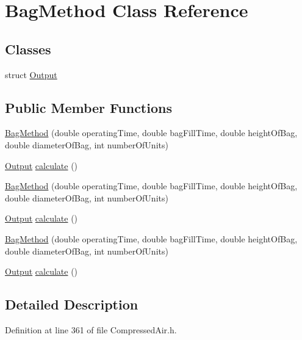 \hypertarget{class_bag_method}{}\section{Bag\+Method Class Reference}
\label{class_bag_method}
\subsection*{Classes}
\begin{DoxyCompactItemize}
\item 
struct \hyperlink{struct_bag_method_1_1_output}{Output}
\end{DoxyCompactItemize}
\subsection*{Public Member Functions}
\begin{DoxyCompactItemize}
\item 
\hyperlink{class_bag_method_ade40cf50da337fb5f83aae1d72698b56}{Bag\+Method} (double operating\+Time, double bag\+Fill\+Time, double height\+Of\+Bag, double diameter\+Of\+Bag, int number\+Of\+Units)
\item 
\hyperlink{struct_bag_method_1_1_output}{Output} \hyperlink{class_bag_method_ab0a8d6b47bf81afbef47d8aaf1c1943c}{calculate} ()
\item 
\hyperlink{class_bag_method_ade40cf50da337fb5f83aae1d72698b56}{Bag\+Method} (double operating\+Time, double bag\+Fill\+Time, double height\+Of\+Bag, double diameter\+Of\+Bag, int number\+Of\+Units)
\item 
\hyperlink{struct_bag_method_1_1_output}{Output} \hyperlink{class_bag_method_afe5b5d6bf23f8af18ad0c75edac1eb4d}{calculate} ()
\item 
\hyperlink{class_bag_method_ade40cf50da337fb5f83aae1d72698b56}{Bag\+Method} (double operating\+Time, double bag\+Fill\+Time, double height\+Of\+Bag, double diameter\+Of\+Bag, int number\+Of\+Units)
\item 
\hyperlink{struct_bag_method_1_1_output}{Output} \hyperlink{class_bag_method_afe5b5d6bf23f8af18ad0c75edac1eb4d}{calculate} ()
\end{DoxyCompactItemize}


\subsection{Detailed Description}


Definition at line 361 of file Compressed\+Air.\+h.



